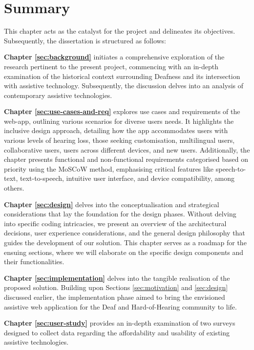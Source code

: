 \documentclass{l4proj}
\begin{document}
\section{Summary}

This chapter acts as the catalyst for the project and delineates its objectives. Subsequently, the dissertation is structured as follows:

\textbf{Chapter \ref{sec:background}} initiates a comprehensive exploration of the research pertinent to the present project, commencing with an in-depth examination of the historical context surrounding Deafness and its intersection with assistive technology. Subsequently, the discussion delves into an analysis of contemporary assistive technologies.

\textbf{Chapter \ref{sec:use-cases-and-req}} explores use cases and requirements of the web-app, outlining various scenarios for diverse users needs. It highlights the inclusive design approach, detailing how the app accommodates users with various levels of hearing loss, those seeking customisation, multilingual users, collaborative users, users across different devices, and new users. Additionally, the chapter presents functional and non-functional requirements categorised based on priority using the MoSCoW method, emphasising critical features like speech-to-text, text-to-speech, intuitive user interface, and device compatibility, among others.

\textbf{Chapter \ref{sec:design}} delves into the conceptualisation and strategical considerations that lay the foundation for the design phases. Without delving into specific coding intricacies, we present an overview of the architectural decisions, user experience considerations, and the general design philosophy that guides the development of our solution. This chapter serves as a roadmap for the ensuing sections, where we will elaborate on the specific design components and their functionalities.

\textbf{Chapter \ref{sec:implementation}} delves into the tangible realisation of the proposed solution. Building upon Sections \ref{sec:motivation} and \ref{sec:design} discussed earlier, the implementation phase aimed to bring the envisioned assistive web application for the Deaf and Hard-of-Hearing community to life.

\textbf{Chapter \ref{sec:user-study}} provides an in-depth examination of two surveys designed to collect data regarding the affordability and usability of existing assistive technologies.
\end{document}
